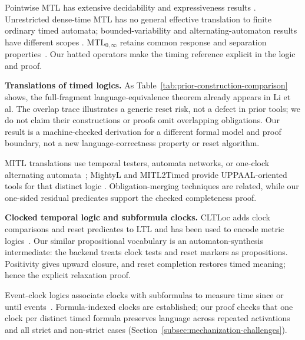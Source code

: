 \documentclass[10pt,journal,compsoc]{IEEEtran}
\newcommand{\runinhead}[1]{\par\smallskip\noindent\textbf{#1}\enspace}
\begin{document}
Pointwise MTL has extensive decidability and expressiveness results
\cite{[RK90],[RTH96],MTLsem,ouaknine_worrell_lics05,
bouyer_chevalier_markey_fsttcs05}. Unrestricted dense-time MTL has no general
effective translation to finite ordinary timed automata; bounded-variability
and alternating-automaton results have different scopes
\cite{nickovic_piterman_formats10,[BM14]}. MTL$_{0,\infty}$ retains common
response and separation properties~\cite{[RTH96],[BDLG14]}. Our hatted
operators make the timing reference explicit in the logic and proof.

\runinhead{Translations of timed logics.}
As Table~\ref{tab:prior-construction-comparison} shows, the full-fragment
language-equivalence theorem already appears in Li et al. The overlap trace
illustrates a generic reset risk, not a defect in prior tools; we do not claim
their constructions or proofs omit overlapping obligations. Our result is a
machine-checked derivation for a different formal model and proof boundary,
not a new language-correctness property or reset algorithm.

MITL translations use temporal testers, automata networks, or one-clock
alternating automata~\cite{maler_mitl_to_ta,
ferrere2019_realtimelogic_to_ta,[BM14]}; MightyL and MITL2Timed provide
UPPAAL-oriented tools for that distinct logic
\cite{mightyl_paper17,mitl2timed_github}. Obligation-merging techniques are
related, while our one-sided residual predicates support the checked
completeness proof.

\runinhead{Clocked temporal logic and subformula clocks.}
CLTLoc adds clock comparisons and reset predicates to LTL and has been used to
encode metric logics~\cite{bersani_cltloc}. Our similar propositional
vocabulary is an automaton-synthesis intermediate: the backend treats clock
tests and reset markers as propositions. Positivity gives upward closure, and
reset completion restores timed meaning; hence the explicit relaxation proof.

Event-clock logics associate clocks with subformulas to measure time since or
until events~\cite{afh_eventclock_tcs99,
raskin_schobbens_jalc99,nickovic_piterman_formats10}. Formula-indexed clocks
are established; our proof checks that one clock per distinct timed formula
preserves language across repeated activations and all strict and non-strict
cases (Section~\ref{subsec:mechanization-challenges}).
\end{document}
